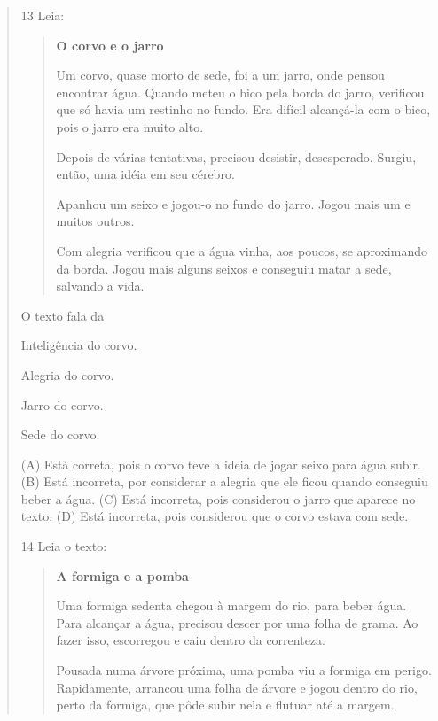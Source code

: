 \begin{verse}
\num{13} Leia:

\begin{quote}
\textbf{O corvo e o jarro}

Um corvo, quase morto de sede, foi a um jarro, onde pensou encontrar
água. Quando meteu o bico pela borda do jarro, verificou que só havia um
restinho no fundo. Era difícil alcançá-la com o bico, pois o jarro era
muito alto.

Depois de várias tentativas, precisou desistir, desesperado. Surgiu,
então, uma idéia em seu cérebro.

Apanhou um seixo e jogou-o no fundo do jarro. Jogou mais
um e muitos outros.

Com alegria verificou que a água vinha, aos poucos, se aproximando da
borda. Jogou mais alguns seixos e conseguiu matar a sede, salvando a
vida.
\end{quote}


O texto fala da

\begin{escolha}
\item Inteligência do corvo.

\item Alegria do corvo.

\item Jarro do corvo.

\item Sede do corvo.
\end{escolha}


(A) Está correta, pois o corvo teve a ideia de jogar seixo para água subir.
(B) Está incorreta, por considerar a alegria que ele ficou quando
conseguiu beber a água.
(C) Está incorreta, pois considerou o jarro que aparece no texto.
(D) Está incorreta, pois considerou que o corvo estava com sede.

\num{14} Leia o texto:

\begin{quote}
\textbf{A formiga e a pomba}

Uma formiga sedenta chegou à margem do rio, para beber
água. Para alcançar a água, precisou descer por uma folha de
grama. Ao fazer isso, escorregou e caiu dentro da correnteza.

Pousada numa árvore próxima, uma pomba viu a
formiga em perigo. Rapidamente, arrancou uma folha de
árvore e jogou dentro do rio, perto da formiga, que pôde subir
nela e flutuar até a margem.
\end{quote}


\end{verse}
